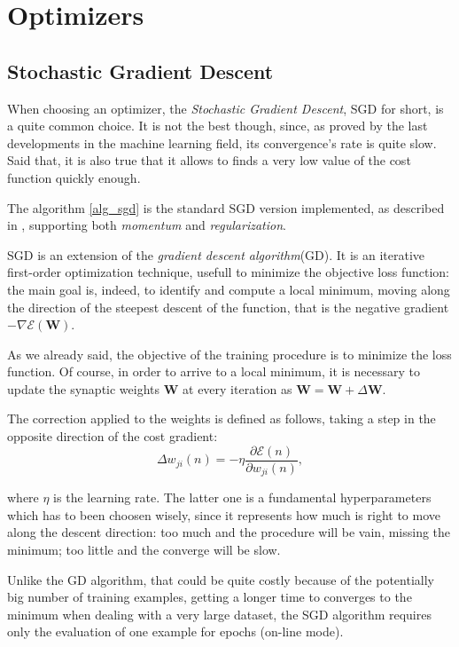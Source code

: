 \chapter{Optimizers} %
\label{cha:optimizers}
	\section{Stochastic Gradient Descent} %
	\label{sec:sgd}
		When choosing an optimizer, the \textit{Stochastic Gradient Descent}, SGD for short, is a quite common
		choice. It is not the best though, since, as proved by the last developments in the machine learning
		field, its convergence's rate is quite slow. 
		Said that, it is also true that it allows to finds a very low value of the cost function quickly enough. 

		The algorithm \ref{alg_sgd} is the standard SGD version implemented, as described in
		\cite{Goodfellow-et-al-2016}, supporting both \textit{momentum} and \textit{regularization}.
		\cite{LIVIERIS2013491}

		SGD is an extension of the \textit{gradient descent algorithm}(GD). It is an iterative first-order optimization technique, usefull to minimize the objective loss function: the main goal is, indeed, to identify and compute a local minimum, moving along the direction of the steepest descent of the function, that is the negative gradient $-\nabla\mathcal{E}(\textbf{W})$.

		As we already said, the objective of the training procedure is to minimize the loss function. Of course, in order to arrive to a local minimum, it is necessary to update the synaptic weights \textbf{W} at every iteration as $\textbf{W} = \textbf{W} +\Delta \textbf{W}$.

		The correction applied to the weights is defined as follows, taking a step in the opposite direction of the cost gradient:
		\begin{equation}
			\label{delta_rule}
			\Delta w_{ji}(n) = -\eta \frac{\partial\mathcal{E}(n)}{\partial w_{ji}(n)},
		\end{equation}

		where $\eta$ is the learning rate. The latter one is a fundamental hyperparameters which has to been choosen wisely, since it represents how much is right to move along the descent direction: too much and the procedure will be vain, missing the minimum; too little and the converge will be slow.

		Unlike the GD algorithm, that could be quite costly because of the potentially big number of training examples, getting a longer time to converges to the minimum when dealing with a very large dataset, the SGD algorithm requires only the evaluation of one example for epochs (on-line mode).

